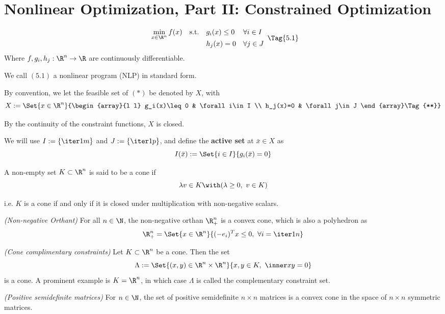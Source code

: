 \section{Nonlinear Optimization, Part II: Constrained Optimization}

\def\pd{\succ} %
\def\psd{\succeq} %
\def\NlpStdForm{\begin{array}{l l l l}
    \displaystyle \min_{x\in\R^n}f(x)
     & \text{s.t.} & g_i(x)\leq0 & \forall i\in I \\
     &             & h_j(x)=0    & \forall j\in J
  \end{array}}

\label{bbe9993}

\begin{equation*}
  \NlpStdForm\Tag{5.1}
\end{equation*}
Where $f,g_i,h_j:\R^n\to\R$ are continuously differentiable.

We call $(5.1)$ a nonlinear program (NLP) in standard form.

By convention, we let the feasible set of $(*)$ be denoted by $X$, with
\begin{equation*}
  X:=\Set{x\in\R^n}{\begin{array}{l l}
      g_i(x)\leq0 & \forall i\in I \\
      h_j(x)=0    & \forall j\in J
    \end{array}\Tag{**}}
\end{equation*}

By the continuity of the constraint functions, $X$ is closed.

We will use $I:=\{\iter1m\}$ and $J:=\{\iter1p\}$, and define the
\textbf{active set} at $\bar x\in X$ as
$$
  I(\bar x):=\Set{i\in I}{g_i(\bar x)=0}
$$

\label{ced12c7}

A non-empty set $K\subset\R^n$ is said to be a cone if
$$
  \lambda v\in K\with(\lambda\geq0,\ v\in K)
$$

i.e. $K$ is a cone if and only if it is closed under multiplication with
non-negative scalars.

\label{c36113c}

\begin{enumerata}
  \item \textit{(Non-negative Orthant)} For all $n\in\N$, the
  non-negative orthan $\R^n_+$ is a convex cone, which is also a polyhedron as
  $$
    \R^n_+=\Set{x\in\R^n}{(-e_i)^Tx\leq 0,\ \forall i=\iter1n}
  $$
  \item \textit{(Cone complimentary constraints)} Let $K\subset \R^n$ be
  a cone. Then the set
  $$
    \Lambda:=\Set{(x,y)\in\R^n\times\R^n}{x,y\in K,\ \inner xy=0}
  $$
  is a cone. A prominent example is $K=\R^n$, in which case $\Lambda$
  is called the complementary constraint set.
  \item \textit{(Positive semidefinite matrices)} For $n\in\N$, the set
  of positive semidefinite $n\times n$ matrices is a convex cone in
  the space of $n\times n$ symmetric matrices.
\end{enumerata}

